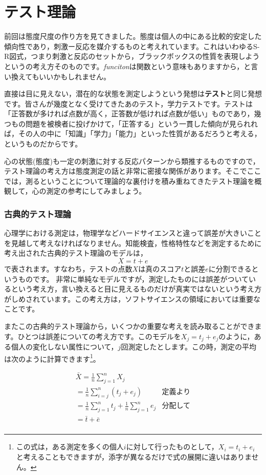 \documentclass{ltjsbook}
\begin{document}
\chapter{テスト理論}
\label{H02_TestTheory}
前回は態度尺度の作り方を見てきました。態度は個人の中にある比較的安定した傾向性であり，刺激ー反応を媒介するものと考えれています。これはいわゆるS-R図式，つまり刺激と反応のセットから，ブラックボックスの性質を表現しようというの考え方そのものです。\textit{funciton}は関数という意味もありますから，と言い換えてもいいかもしれません。

直接は目に見えない，潜在的な状態を測定しようという発想は\textbf{テスト}と同じ発想です。皆さんが幾度となく受けてきたあのテスト，学力テストです。テストは「正答数が多ければ点数が高く，正答数が低ければ点数が低い」ものであり，幾つもの問題を被検者に投げかけて，「正答する」という一貫した傾向が見られれば，その人の中に「知識」「学力」「能力」といった性質があるだろうと考える，というものだからです。

心の状態(態度)も一定の刺激に対する反応パターンから類推するものですので，テスト理論の考え方は態度測定の話と非常に密接な関係があります。そこでここでは，測るということについて理論的な裏付けを積み重ねてきたテスト理論を概観して，心の測定の参考にしてみましょう。

\subsection{古典的テスト理論}
心理学における測定は，物理学などハードサイエンスと違って誤差が大きいことを見越して考えなければなりません。知能検査，性格特性などを測定するために考え出された古典的テスト理論のモデルは，
\[X=t+e\]
で表されます。すなわち，テストの点数$X$は真のスコア$t$と誤差$e$に分割できるというものです。
非常に単純なモデルですが，測定したものには誤差がついているという考え方，言い換えると目に見えるものだけが真実ではないという考え方がしめされています。この考え方は，ソフトサイエンスの領域においては重要なことです。

またこの古典的テスト理論から，いくつかの重要な考えを読み取ることができます。ひとつは誤差についての考え方です。このモデルを$X_j = t_j + e_j$のように，ある個人の変化しない属性について，$j$回測定したとします。この時，測定の平均は次のように計算できます\footnote{この式は，ある測定を多くの個人$i$に対して行ったものとして，$X_i = t_i + e_i$と考えることもできますが，添字が異なるだけで式の展開に違いはありません。}。

\begin{align*}
     & \bar{X}  =  \frac{1}{n}\sum_{j=1}^n X_j                           &             & \mbox{} \\
     & =  \frac{1}{n}\sum_{i=j}^n (t_j + e_j)                            & \mbox{定義より}           \\
     & =  \frac{1}{n} \sum_{j=1}^n  t_j +  \frac{1}{n} \sum_{j=1}^n  e_j & \mbox{分配して}           \\
     & =  \bar{t} + \bar{e}                                              & \mbox{}               \\
\end{align*}
\end{document}
